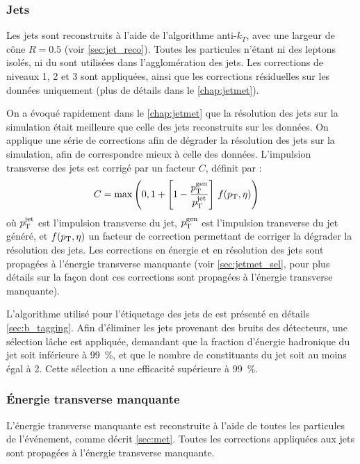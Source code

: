 \subsubsection{Jets}

Les jets sont reconstruits à l'aide de l'algorithme anti-$k_T$, avec une largeur de cône $R = \num{0.5}$ (voir \cref{sec:jet_reco}). Toutes les particules \pf n'étant ni des leptons isolés, ni du \pu sont utilisées dans l'agglomération des jets. Les corrections de niveaux 1, 2 et 3 sont appliquées, ainsi que les corrections résiduelles sur les données uniquement (plus de détails dans le \cref{chap:jetmet}).

On a évoqué rapidement dans le \cref{chap:jetmet} que la résolution des jets sur la simulation était meilleure que celle des jets reconstruits sur les données. On applique une série de corrections afin de dégrader la résolution des jets sur la simulation, afin de correspondre mieux à celle des données. L'impulsion transverse des jets est corrigé par un facteur $C$, définit par :
\begin{align*}
  C &= \max\left(0, 1 + \left[ 1 - \frac{p_{\mathrm{T}}^\text{gen}}{p_{\mathrm{T}}^\text{jet}} \right] \, f(p_{\mathrm{T}}, \eta)\right)
\end{align*}
où $p_{\mathrm{T}}^\text{jet}$ est l'impulsion transverse du jet, $p_{\mathrm{T}}^\text{gen}$ est l'impulsion transverse du jet généré, et $f(p_{\mathrm{T}}, \eta)$ un facteur de correction permettant de corriger la dégrader la résolution des jets. Les corrections en énergie et en résolution des jets sont propagées à l'énergie transverse manquante (voir \cref{sec:jetmet_sel},  pour plus détails sur la façon dont ces corrections sont propagées à l'énergie transverse manquante).

L'algorithme utilisé pour l'étiquetage des jets de \Pbottom est présenté en détails \cref{sec:b_tagging}. Afin d'éliminer les jets provenant des bruits des détecteurs, une sélection lâche est appliquée, demandant que la fraction d'énergie hadronique du jet soit inférieure à \SI{99}{\percent}, et que le nombre de constituants du jet soit au moins égal à 2. Cette sélection a une efficacité supérieure à \SI{99}{\%}.

\subsubsection{Énergie transverse manquante}

L'énergie transverse manquante est reconstruite à l'aide de toutes les particules \pf de l'événement, comme décrit \cref{sec:met}. Toutes les corrections appliquées aux jets sont propagées à l'énergie transverse manquante.

